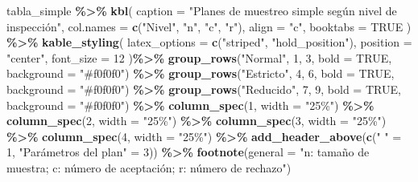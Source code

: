 \documentclass[
  12pt,
]{article}
\newenvironment{Shaded}{\begin{snugshade}}{\end{snugshade}}
\newcommand{\AttributeTok}[1]{\textcolor[rgb]{0.13,0.29,0.53}{#1}}
\newcommand{\ConstantTok}[1]{\textcolor[rgb]{0.56,0.35,0.01}{#1}}
\newcommand{\DecValTok}[1]{\textcolor[rgb]{0.00,0.00,0.81}{#1}}
\newcommand{\FunctionTok}[1]{\textcolor[rgb]{0.13,0.29,0.53}{\textbf{#1}}}
\newcommand{\NormalTok}[1]{#1}
\newcommand{\OtherTok}[1]{\textcolor[rgb]{0.56,0.35,0.01}{#1}}
\newcommand{\SpecialCharTok}[1]{\textcolor[rgb]{0.81,0.36,0.00}{\textbf{#1}}}
\newcommand{\StringTok}[1]{\textcolor[rgb]{0.31,0.60,0.02}{#1}}
\begin{document}
\begin{Shaded}
\begin{Highlighting}[]
\NormalTok{tabla\_simple }\SpecialCharTok{\%\textgreater{}\%}
  \FunctionTok{kbl}\NormalTok{(}
    \AttributeTok{caption =} \StringTok{"Planes de muestreo simple según nivel de inspección"}\NormalTok{,}
    \AttributeTok{col.names =} \FunctionTok{c}\NormalTok{(}\StringTok{"Nivel"}\NormalTok{, }\StringTok{"n"}\NormalTok{, }\StringTok{"c"}\NormalTok{, }\StringTok{"r"}\NormalTok{),}
    \AttributeTok{align =} \StringTok{"c"}\NormalTok{,}
    \AttributeTok{booktabs =} \ConstantTok{TRUE}
\NormalTok{  ) }\SpecialCharTok{\%\textgreater{}\%}
  \FunctionTok{kable\_styling}\NormalTok{(}
  \AttributeTok{latex\_options =} \FunctionTok{c}\NormalTok{(}\StringTok{"striped"}\NormalTok{, }\StringTok{"hold\_position"}\NormalTok{),}
  \AttributeTok{position =} \StringTok{"center"}\NormalTok{,}
  \AttributeTok{font\_size =} \DecValTok{12}
\NormalTok{)}\SpecialCharTok{\%\textgreater{}\%}
  \FunctionTok{group\_rows}\NormalTok{(}\StringTok{"Normal"}\NormalTok{, }\DecValTok{1}\NormalTok{, }\DecValTok{3}\NormalTok{, }\AttributeTok{bold =} \ConstantTok{TRUE}\NormalTok{, }\AttributeTok{background =} \StringTok{"\#f0f0f0"}\NormalTok{) }\SpecialCharTok{\%\textgreater{}\%}
  \FunctionTok{group\_rows}\NormalTok{(}\StringTok{"Estricto"}\NormalTok{, }\DecValTok{4}\NormalTok{, }\DecValTok{6}\NormalTok{, }\AttributeTok{bold =} \ConstantTok{TRUE}\NormalTok{, }\AttributeTok{background =} \StringTok{"\#f0f0f0"}\NormalTok{) }\SpecialCharTok{\%\textgreater{}\%}
  \FunctionTok{group\_rows}\NormalTok{(}\StringTok{"Reducido"}\NormalTok{, }\DecValTok{7}\NormalTok{, }\DecValTok{9}\NormalTok{, }\AttributeTok{bold =} \ConstantTok{TRUE}\NormalTok{, }\AttributeTok{background =} \StringTok{"\#f0f0f0"}\NormalTok{) }\SpecialCharTok{\%\textgreater{}\%}
  \FunctionTok{column\_spec}\NormalTok{(}\DecValTok{1}\NormalTok{, }\AttributeTok{width =} \StringTok{"25\%"}\NormalTok{) }\SpecialCharTok{\%\textgreater{}\%}
  \FunctionTok{column\_spec}\NormalTok{(}\DecValTok{2}\NormalTok{, }\AttributeTok{width =} \StringTok{"25\%"}\NormalTok{) }\SpecialCharTok{\%\textgreater{}\%}
  \FunctionTok{column\_spec}\NormalTok{(}\DecValTok{3}\NormalTok{, }\AttributeTok{width =} \StringTok{"25\%"}\NormalTok{) }\SpecialCharTok{\%\textgreater{}\%}
  \FunctionTok{column\_spec}\NormalTok{(}\DecValTok{4}\NormalTok{, }\AttributeTok{width =} \StringTok{"25\%"}\NormalTok{) }\SpecialCharTok{\%\textgreater{}\%}
  \FunctionTok{add\_header\_above}\NormalTok{(}\FunctionTok{c}\NormalTok{(}\StringTok{" "} \OtherTok{=} \DecValTok{1}\NormalTok{, }\StringTok{"Parámetros del plan"} \OtherTok{=} \DecValTok{3}\NormalTok{)) }\SpecialCharTok{\%\textgreater{}\%}
  \FunctionTok{footnote}\NormalTok{(}\AttributeTok{general =} \StringTok{"n: tamaño de muestra; c: número de aceptación; r: número de rechazo"}\NormalTok{)}
\end{Highlighting}
\end{Shaded}
\end{document}

